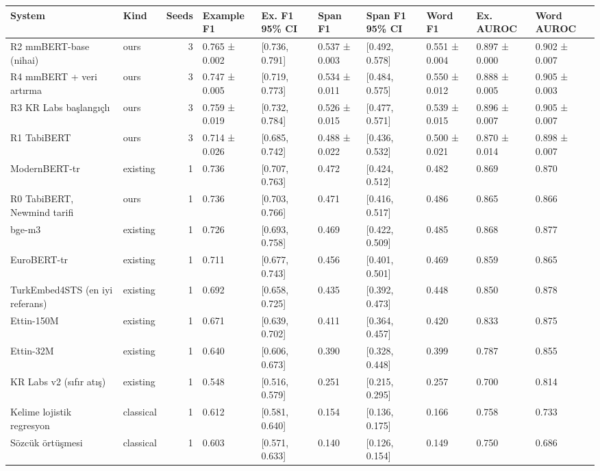\begin{tabular}{llrlllllll}
\toprule
System & Kind & Seeds & Example F1 & Ex. F1 95\% CI & Span F1 & Span F1 95\% CI & Word F1 & Ex. AUROC & Word AUROC \\
\midrule
R2 mmBERT-base (nihai) & ours & 3 & 0.765 ± 0.002 & [0.736, 0.791] & 0.537 ± 0.003 & [0.492, 0.578] & 0.551 ± 0.004 & 0.897 ± 0.000 & 0.902 ± 0.007 \\
R4 mmBERT + veri artırma & ours & 3 & 0.747 ± 0.005 & [0.719, 0.773] & 0.534 ± 0.011 & [0.484, 0.575] & 0.550 ± 0.012 & 0.888 ± 0.005 & 0.905 ± 0.003 \\
R3 KR Labs başlangıçlı & ours & 3 & 0.759 ± 0.019 & [0.732, 0.784] & 0.526 ± 0.015 & [0.477, 0.571] & 0.539 ± 0.015 & 0.896 ± 0.007 & 0.905 ± 0.007 \\
R1 TabiBERT & ours & 3 & 0.714 ± 0.026 & [0.685, 0.742] & 0.488 ± 0.022 & [0.436, 0.532] & 0.500 ± 0.021 & 0.870 ± 0.014 & 0.898 ± 0.007 \\
ModernBERT-tr & existing & 1 & 0.736 & [0.707, 0.763] & 0.472 & [0.424, 0.512] & 0.482 & 0.869 & 0.870 \\
R0 TabiBERT, Newmind tarifi & ours & 1 & 0.736 & [0.703, 0.766] & 0.471 & [0.416, 0.517] & 0.486 & 0.865 & 0.866 \\
bge-m3 & existing & 1 & 0.726 & [0.693, 0.758] & 0.469 & [0.422, 0.509] & 0.485 & 0.868 & 0.877 \\
EuroBERT-tr & existing & 1 & 0.711 & [0.677, 0.743] & 0.456 & [0.401, 0.501] & 0.469 & 0.859 & 0.865 \\
TurkEmbed4STS (en iyi referans) & existing & 1 & 0.692 & [0.658, 0.725] & 0.435 & [0.392, 0.473] & 0.448 & 0.850 & 0.878 \\
Ettin-150M & existing & 1 & 0.671 & [0.639, 0.702] & 0.411 & [0.364, 0.457] & 0.420 & 0.833 & 0.875 \\
Ettin-32M & existing & 1 & 0.640 & [0.606, 0.673] & 0.390 & [0.328, 0.448] & 0.399 & 0.787 & 0.855 \\
KR Labs v2 (sıfır atış) & existing & 1 & 0.548 & [0.516, 0.579] & 0.251 & [0.215, 0.295] & 0.257 & 0.700 & 0.814 \\
Kelime lojistik regresyon & classical & 1 & 0.612 & [0.581, 0.640] & 0.154 & [0.136, 0.175] & 0.166 & 0.758 & 0.733 \\
Sözcük örtüşmesi & classical & 1 & 0.603 & [0.571, 0.633] & 0.140 & [0.126, 0.154] & 0.149 & 0.750 & 0.686 \\
\bottomrule
\end{tabular}
